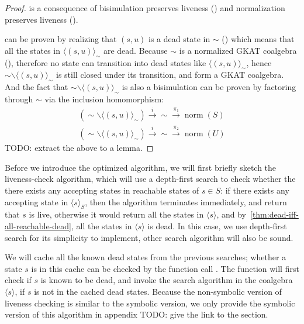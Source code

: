 \documentclass[conference]{IEEEtran}
\DeclareMathOperator{\norm}{\mathrm{norm}}
\begin{document}
\begin{proof}
     is a consequence of bisimulation preserves liveness () and normalization preserves liveness ().

     can be proven by realizing that \((s, u)\) is a dead state in \(∼\) () which means that all the states in \(⟨(s, u)⟩_∼\) are dead.
    Because \(∼\) is a normalized GKAT coalgebra (), therefore no state can transition into dead states like \(⟨(s, u)⟩_∼\), hence \({∼} ∖ ⟨(s, u)⟩_∼\) is still closed under its transition, and form a GKAT coalgebra.
    And the fact that \({∼} ∖ ⟨(s, u)⟩_∼\) is also a bisimulation can be proven by factoring through \(∼\) via the inclusion homomorphism:
    \begin{align*}
        ({∼} ∖ ⟨(s, u)⟩_∼) \xrightarrow{i} {∼} \xrightarrow{π₁} \norm(S) \\
        ({∼} ∖ ⟨(s, u)⟩_∼) \xrightarrow{i} {∼} \xrightarrow{π₂} \norm(U)
    \end{align*}
    TODO: extract the above to a lemma.
\end{proof}

Before we introduce the optimized algorithm, we will first briefly sketch the liveness-check algorithm, which will use a depth-first search to check whether the there exists any accepting states in reachable states of \(s ∈ S\): if there exists any accepting state in \(⟨s⟩_S\), then the algorithm terminates immediately, and return that \(s\) is live, otherwise it would return all the states in \(⟨s⟩\), and by~\cref{thm:dead-iff-all-reachable-dead}, all the states in \(⟨s⟩\) is dead.
In this case, we use depth-first search for its simplicity to implement, other search algorithm will also be sound.

We will cache all the known dead states from the previous searches; whether a state \(s\) is in this cache can be checked by the function call . 
The function  will first check if \(s\) is known to be dead, and invoke the search algorithm in the coalgebra \(⟨s⟩\), if \(s\) is not in the cached dead states.
Because the non-symbolic version of liveness checking is similar to the symbolic version, we only provide the symbolic version of this algorithm in appendix
TODO: give the link to the section.
\end{document}
